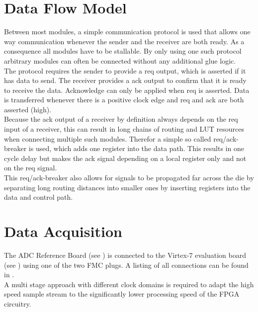 \section{Data Flow Model}
\label{sec:fpga_reqack}
Between most modules, a simple communication protocol is used that allows
one way communication whenever the sender and the receiver are both
ready. As a consequence all modules have to be stallable. By only using
one such protocol arbitrary modules can often be connected
without any additional glue logic. \\

The protocol requires the sender to provide a \acrfull{req} output, which
is asserted if it has data to send. The receiver provides a \gls{ack}
output to confirm that it is ready to receive the data.
Acknowledge can only be applied when \gls{req} is asserted.
Data is transferred whenever there is a positive clock edge and
\gls{req} and \gls{ack} are both asserted (high). \\

Because the \gls{ack} output of a receiver by definition always depends on the
\gls{req} input of a receiver, this can result in long chains of routing and
\gls{LUT} resources when connecting multiple such modules.
Therefor a simple so called \gls{req}/\gls{ack}-breaker is used, which adds one
register into the data path. This results in one cycle delay but makes the
\gls{ack} signal depending on a local register only and not on the
\gls{req} signal. \\

This \gls{req}/\gls{ack}-breaker also allows for signals to be propagated
far across the die by separating long routing distances into smaller
ones by inserting registers into the data and control path. \\

\section{Data Acquisition}
\label{sec:fpga_adc}

The \gls{ADC} Reference Board (see ) is connected
to the Virtex-7 evaluation board (see )
using one of the two \gls{FMC} plugs.
A listing of all connections can be found in . \\

A multi stage approach with different clock domains is required to adapt the
high speed sample stream to the significantly lower processing speed of the
\gls{FPGA} circuitry.  \\

